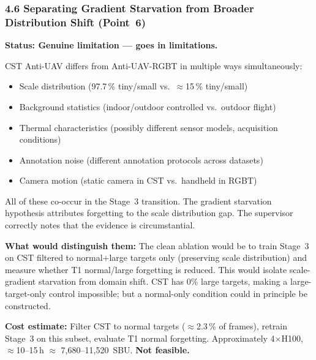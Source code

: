\subsubsection*{4.6 Separating Gradient Starvation from Broader Distribution Shift (Point~6)}

\textbf{Status: Genuine limitation --- goes in limitations.}

\vspace{0.5em}
\noindent CST Anti-UAV differs from Anti-UAV-RGBT in multiple ways simultaneously:
\begin{itemize}
    \item Scale distribution (97.7\,\% tiny/small vs.\ $\approx$15\,\% tiny/small)
    \item Background statistics (indoor/outdoor controlled vs.\ outdoor flight)
    \item Thermal characteristics (possibly different sensor models, acquisition conditions)
    \item Annotation noise (different annotation protocols across datasets)
    \item Camera motion (static camera in CST vs.\ handheld in RGBT)
\end{itemize}

\noindent All of these co-occur in the Stage~3 transition. The gradient starvation
hypothesis attributes forgetting to the scale distribution gap. The supervisor
correctly notes that the evidence is circumstantial.

\vspace{0.5em}
\noindent\textbf{What would distinguish them:}
The clean ablation would be to train Stage~3 on CST filtered to normal+large
targets only (preserving scale distribution) and measure whether T1 normal/large
forgetting is reduced. This would isolate scale-gradient starvation from domain
shift. CST has 0\% large targets, making a large-target-only control impossible;
but a normal-only condition could in principle be constructed.

\vspace{0.5em}
\noindent\textbf{Cost estimate:} Filter CST to normal targets ($\approx$2.3\,\%
of frames), retrain Stage~3 on this subset, evaluate T1 normal forgetting.
Approximately 4$\times$H100, $\approx$10--15\,h $\approx$ 7,680--11,520~SBU.
\textbf{Not feasible.}

